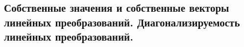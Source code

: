 \subsection{Собственные значения и собственные векторы линейных преобразований. Диагонализируемость линейных преобразований.}
